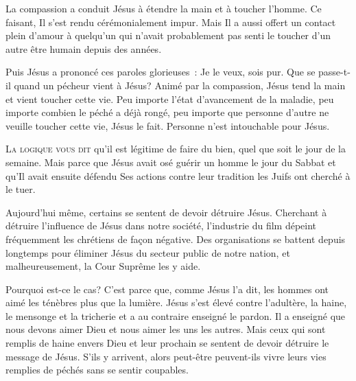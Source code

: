 
La compassion a conduit Jésus à étendre la main et à toucher l'homme.
 Ce faisant, Il s'est rendu cérémonialement impur.
 Mais Il a aussi offert un contact plein d'amour à quelqu'un
 qui n'avait probablement pas senti le toucher d'un autre être humain
 depuis des années. 

Puis Jésus a prononcé ces paroles glorieuses~: 
 \og Je le veux, sois pur. \fg{}
 Que se passe-t-il quand un pécheur vient à Jésus?
 Animé par la compassion, Jésus tend la main et vient toucher cette vie.
 Peu importe l'état d'avancement de la maladie,
 peu importe combien le péché a déjà rongé, peu importe que personne
 d'autre ne veuille toucher cette vie, Jésus le fait.
 Personne n'est intouchable pour Jésus. 

\dvrule






\lettrine{L}{a logique vous dit} qu'il est légitime de faire du bien,
 quel que soit le jour de la semaine.
 Mais parce que Jésus avait osé guérir un homme le jour du Sabbat
 \ocadr et qu'Il avait ensuite défendu Ses actions contre leur tradition \fcadr{}
 les Juifs ont cherché à le tuer.

Aujourd'hui même, certains se sentent de devoir détruire Jésus.
 Cherchant à détruire l'influence de Jésus dans notre société,
 l'industrie du film dépeint fréquemment les chrétiens de façon négative.
 Des organisations se battent depuis longtemps pour éliminer
 Jésus du secteur public de notre nation, et malheureusement,
 la Cour Suprême
  les y aide.


Pourquoi est-ce le cas? C'est parce que, comme Jésus l'a dit,
 les hommes ont aimé les ténèbres plus que la lumière.
 Jésus s'est élevé contre l'adultère, la haine, le mensonge
 et la tricherie et a au contraire enseigné le pardon.
 Il a enseigné que nous devons aimer Dieu et nous aimer les uns les autres.
 Mais ceux qui sont remplis de haine envers Dieu et leur prochain
 se sentent de devoir détruire le message de Jésus.
 S'ils y arrivent, alors peut-être peuvent-ils vivre leurs vies
 remplies de péchés sans se sentir coupables.

